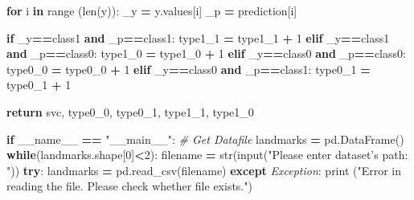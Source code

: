 \documentclass[10pt,letterpaper]{article}
\newenvironment{Shaded}{\begin{snugshade}}{\end{snugshade}}
\newcommand{\KeywordTok}[1]{\textcolor[rgb]{0.13,0.29,0.53}{\textbf{#1}}}
\newcommand{\DecValTok}[1]{\textcolor[rgb]{0.00,0.00,0.81}{#1}}
\newcommand{\StringTok}[1]{\textcolor[rgb]{0.31,0.60,0.02}{#1}}
\newcommand{\CommentTok}[1]{\textcolor[rgb]{0.56,0.35,0.01}{\textit{#1}}}
\newcommand{\VariableTok}[1]{\textcolor[rgb]{0.00,0.00,0.00}{#1}}
\newcommand{\ControlFlowTok}[1]{\textcolor[rgb]{0.13,0.29,0.53}{\textbf{#1}}}
\newcommand{\OperatorTok}[1]{\textcolor[rgb]{0.81,0.36,0.00}{\textbf{#1}}}
\newcommand{\BuiltInTok}[1]{#1}
\newcommand{\PreprocessorTok}[1]{\textcolor[rgb]{0.56,0.35,0.01}{\textit{#1}}}
\newcommand{\NormalTok}[1]{#1}
\begin{document}
\begin{Shaded}
\begin{Highlighting}[]
    \ControlFlowTok{for}\NormalTok{ i }\KeywordTok{in} \BuiltInTok{range}\NormalTok{ (}\BuiltInTok{len}\NormalTok{(y)):}
\NormalTok{        _y }\OperatorTok{=}\NormalTok{ y.values[i]}
\NormalTok{        _p }\OperatorTok{=}\NormalTok{ prediction[i]}

        \ControlFlowTok{if}\NormalTok{ _y}\OperatorTok{==}\NormalTok{class1 }\KeywordTok{and}\NormalTok{ _p}\OperatorTok{==}\NormalTok{class1:}
\NormalTok{            type1_1 }\OperatorTok{=}\NormalTok{ type1_1 }\OperatorTok{+} \DecValTok{1}
        \ControlFlowTok{elif}\NormalTok{ _y}\OperatorTok{==}\NormalTok{class1 }\KeywordTok{and}\NormalTok{ _p}\OperatorTok{==}\NormalTok{class0:}
\NormalTok{            type1_0 }\OperatorTok{=}\NormalTok{ type1_0 }\OperatorTok{+} \DecValTok{1}
        \ControlFlowTok{elif}\NormalTok{ _y}\OperatorTok{==}\NormalTok{class0 }\KeywordTok{and}\NormalTok{ _p}\OperatorTok{==}\NormalTok{class0:}
\NormalTok{            type0_0 }\OperatorTok{=}\NormalTok{ type0_0 }\OperatorTok{+} \DecValTok{1}
        \ControlFlowTok{elif}\NormalTok{ _y}\OperatorTok{==}\NormalTok{class0 }\KeywordTok{and}\NormalTok{ _p}\OperatorTok{==}\NormalTok{class1:}
\NormalTok{            type0_1 }\OperatorTok{=}\NormalTok{ type0_1 }\OperatorTok{+} \DecValTok{1}
    
    \ControlFlowTok{return}\NormalTok{ svc, type0_0, type0_1, type1_1, type1_0}


\ControlFlowTok{if} \VariableTok{__name__} \OperatorTok{==} \StringTok{"__main__"}\NormalTok{:}
    \CommentTok{# Get Datafile}
\NormalTok{    landmarks }\OperatorTok{=}\NormalTok{ pd.DataFrame()}
    \ControlFlowTok{while}\NormalTok{(landmarks.shape[}\DecValTok{0}\NormalTok{]}\OperatorTok{<}\DecValTok{2}\NormalTok{):}
\NormalTok{        filename }\OperatorTok{=} \BuiltInTok{str}\NormalTok{(}\BuiltInTok{input}\NormalTok{(}\StringTok{"Please enter dataset's path: "}\NormalTok{))}
        \ControlFlowTok{try}\NormalTok{:}
\NormalTok{            landmarks }\OperatorTok{=}\NormalTok{ pd.read_csv(filename)}
        \ControlFlowTok{except} \PreprocessorTok{Exception}\NormalTok{:}
            \BuiltInTok{print}\NormalTok{ (}\StringTok{"Error in reading the file.}
\StringTok{                Please check whether file exists."}\NormalTok{)}


\end{Highlighting}
\end{Shaded}
\end{document}
